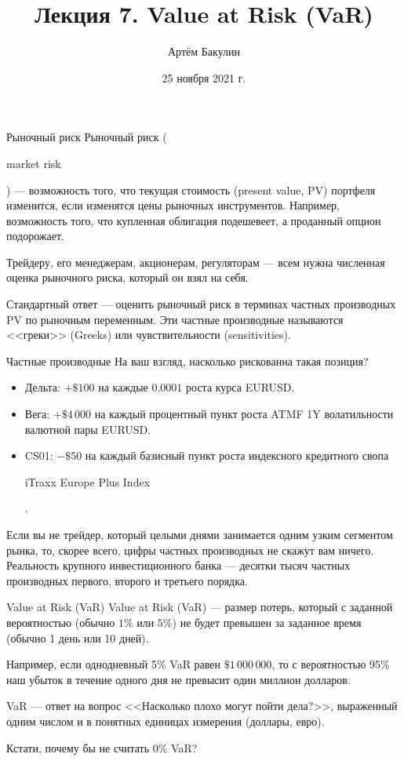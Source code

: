 \documentclass{beamer}
\title{Лекция 7. Value at Risk (VaR)}
\author{Артём Бакулин}
\date{25 ноября 2021 г.}
\newcommand{\en}[1]{\begin{otherlanguage}{english}#1\end{otherlanguage}}
\begin{document}
\begin{frame}
\titlepage
\end{frame}



\begin{frame}{Рыночный риск}
\justify
\alert{Рыночный риск} (\en{market risk}) --- возможность того, что текущая стоимость (present value, PV)  
портфеля изменится, если изменятся цены рыночных инструментов. Например, возможность 
того, что купленная облигация подешевеет, а проданный опцион подорожает.

\justify
Трейдеру, его менеджерам, акционерам, регуляторам --- всем нужна численная оценка 
рыночного риска, который он взял на себя.

\justify
Стандартный ответ  --- оценить рыночный риск в 
терминах частных производных PV по рыночным переменным. Эти частные производные 
называются <<греки>> (Greeks) или чувствительности (sensitivities).
\end{frame}



\begin{frame}{Частные производные}
\justifying
На ваш взгляд, насколько рискованна такая позиция?
\begin{itemize}
\justifying
\item Дельта:  $+\$100$ на каждые $0.0001$ роста курса EURUSD.
\item Вега: $+\$4\,000$ на каждый процентный пункт роста ATMF 1Y волатильности валютной пары EURUSD.
\item CS01: $-\$50$ на каждый базисный пункт роста индексного кредитного свопа \en{iTraxx Europe Plus Index}.
\end{itemize}

\justify
Если вы не трейдер, который целыми днями занимается одним узким сегментом рынка, то, скорее всего, цифры частных производных не скажут вам ничего. Реальность крупного инвестиционного банка --- десятки тысяч частных производных первого, второго и третьего порядка.
\end{frame}



\begin{frame}{Value at Risk (VaR)}
\justify
\alert{Value at Risk (VaR)} --- размер потерь, который с заданной вероятностью (обычно $1\%$ или $5\%$) не будет превышен за заданное время (обычно 1 день или 10 дней). 

\justify
Например, если однодневный 5\% VaR равен $\$1\,000\,000$, то с вероятностью 95\% наш убыток в течение одного дня не превысит один миллион долларов.

\justify
VaR --- ответ на вопрос <<Насколько плохо могут пойти дела?>>, выраженный одним числом и в понятных единицах измерения (доллары, евро).

\justify
Кстати, почему бы не считать 0\% VaR?
\end{frame}
\end{document}

